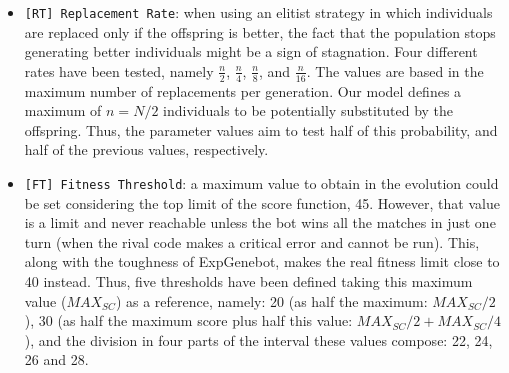 \documentclass[runningheads,a4paper]{llncs}
\begin{document}
\begin{itemize}
    \item \texttt{[RT] Replacement Rate}: when using an elitist strategy in which individuals are replaced only if the offspring is better, the fact that the population stops generating better individuals might be a sign of stagnation. Four different rates have been tested, namely $\frac{n}{2}$, $\frac{n}{4}$, $\frac{n}{8}$, and $\frac{n}{16}$. %
   The values are based in the maximum number of replacements per generation. Our model defines a maximum of $n = N/2$ individuals to be potentially substituted by the offspring. Thus, the parameter values aim to test half of this probability, and half of the previous values, respectively.


    \item \texttt{[FT] Fitness Threshold}: a maximum value to obtain in the evolution could be set considering the top limit of the score function, 45. However, that value is a limit and never reachable unless the bot wins all the matches in just one turn (when the rival code makes a critical error and cannot be run). This, along with the toughness of ExpGenebot, makes the real fitness limit close to 40 instead. Thus, five thresholds have been defined taking this maximum value ($MAX_{SC}$) as a reference, namely: 20 (as half the maximum: $MAX_{SC}/2$), 30 (as half the maximum score plus half this value: $MAX_{SC}/2 + MAX_{SC}/4$), and the division in four parts of the interval these values compose: 22, 24, 26 and 28.


\end{itemize}
\end{document}
